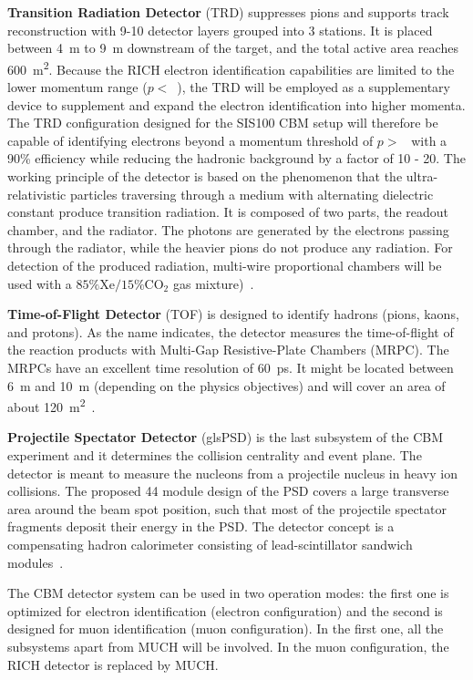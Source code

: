 \textbf{Transition Radiation Detector} (\gls{TRD}) suppresses pions and  supports track reconstruction with 9-10 detector layers grouped into 3 stations. It is placed between \SI{4}{\metre} to \SI{9}{\metre} downstream of the target, and the total active area reaches \SI{600}{\square\metre}. Because the RICH electron identification capabilities are limited to the lower momentum range ($p < $~), the TRD will be employed as a supplementary device to supplement and expand the electron identification into higher momenta. The TRD configuration designed for the SIS100 CBM setup will therefore be capable of identifying electrons beyond a momentum threshold of $p > $~ with a 90\% efficiency while reducing the hadronic background by a factor of 10 - 20. The working principle of the detector is based on the phenomenon that the ultra-relativistic particles traversing through a medium with alternating dielectric constant produce transition radiation. It is composed of two parts, the readout chamber, and the radiator. The photons are generated by the electrons passing through the radiator, while the heavier pions do not produce any radiation. For detection of the produced radiation, multi-wire proportional chambers will be used with a $\mathrm{85\% Xe/15\% CO_{2}}$ gas mixture)~\cite{TRD}. \bigbreak

\textbf{Time-of-Flight Detector} (\gls{TOF}) is designed to identify hadrons (pions, kaons, and protons). As the name indicates, the detector measures the time-of-flight of the reaction products with Multi-Gap Resistive-Plate Chambers (\gls{MRPC}). The \glspl{MRPC} have an excellent time resolution of \SI{60}{\pico\second}.  It might be located between \SI{6}{\metre} and \SI{10}{\metre} (depending on the physics objectives) and will cover an area of about \SI{120}{\square\metre}~\cite{TOF}. \bigbreak

\textbf{Projectile Spectator Detector} (gls{PSD}) is the last subsystem of the \gls{CBM} experiment and it determines the collision centrality and event plane. The detector is meant to measure the nucleons from a projectile nucleus in heavy ion collisions. The proposed 44 module design of the PSD covers a large transverse area around the beam spot position, such that most of the projectile spectator fragments deposit their energy in the \gls{PSD}. The detector concept is a compensating hadron calorimeter consisting of lead-scintillator sandwich modules~\cite{PSD}.\bigbreak


The CBM detector system can be used in two operation modes: the first one is optimized for electron identification (electron configuration) and the second is designed for muon identification (muon configuration). In the first one, all the subsystems apart from MUCH will be involved. In the muon configuration, the \gls{RICH} detector is replaced by \gls{MUCH}.

